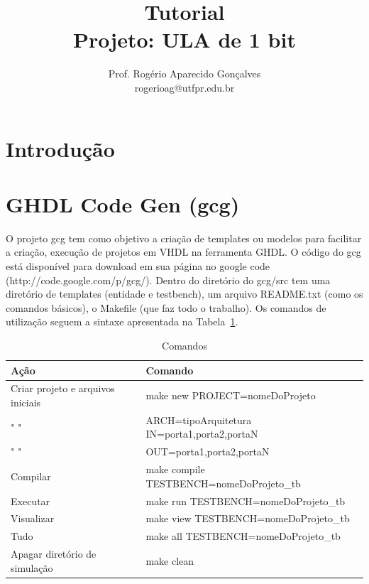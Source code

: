 \documentclass[a4paper,10pt]{report}
\title{Tutorial \\ Projeto: ULA de 1 bit}
\author{Prof. Rogério Aparecido Gonçalves \\ rogerioag@utfpr.edu.br}
\begin{document}
\maketitle
\pagestyle{plain} %
\cleardoublepage


\setcounter{chapter}{1}
\setcounter{section}{0}


\section{Introdução}

\section{GHDL Code Gen (gcg)}
O projeto gcg tem como objetivo a criação de templates ou modelos para facilitar a criação, execução de projetos em VHDL na ferramenta GHDL.
O código do gcg está disponível para download em sua página no google code (http://code.google.com/p/gcg/).
Dentro do diretório do gcg/src tem uma diretório de templates (entidade e testbench), um arquivo README.txt (como os comandos básicos), o Makefile (que faz todo o trabalho).
Os comandos de utilização seguem a sintaxe apresentada na Tabela~\ref{tab:comandos_gcg}.

\begin{table}[H]
\centering
\caption{Comandos} %
\begin{tabular}{ll} %
\hline %
Ação & Comando \\ %
\hline
\hline
Criar projeto e arquivos iniciais & make new PROJECT=nomeDoProjeto \\
" " & ARCH=tipoArquitetura IN=porta1,porta2,portaN \\ 
" " & OUT=porta1,porta2,portaN \\
Compilar & make compile TESTBENCH=nomeDoProjeto\_tb \\
Executar & make run TESTBENCH=nomeDoProjeto\_tb \\
Visualizar & make view TESTBENCH=nomeDoProjeto\_tb \\
Tudo & make all TESTBENCH=nomeDoProjeto\_tb \\
Apagar diretório de simulação & make clean \\
\hline
\end{tabular}
\label{tab:comandos_gcg}
\end{table}
\end{document}
